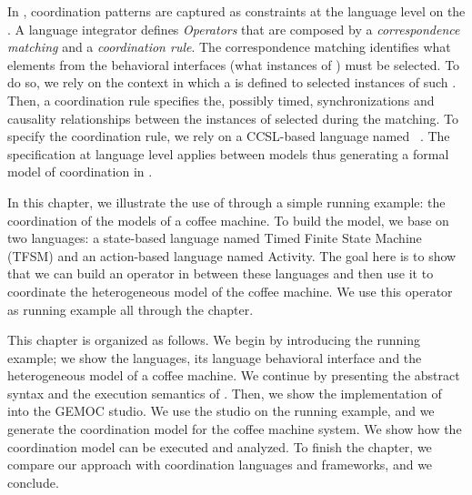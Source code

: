 In \bcool, coordination patterns are captured as constraints at the language level on the \dse. A language integrator defines \emph{Operators} that are composed by a \emph{correspondence matching} and a \emph{coordination rule}. The correspondence matching identifies what elements from the behavioral interfaces (\ie what instances of \dse) must be selected. To do so, we rely on the context in which a \dse is defined to selected instances of such \dse. Then, a coordination rule specifies the, possibly timed, synchronizations and causality relationships between the instances of \dse selected during the matching. To specify the coordination rule, we rely on a CCSL-based language named \moccml~\cite{moccmlbib}. The specification at language level applies between models thus generating a formal model of coordination in \ccsl.

	



In this chapter, we illustrate the use of \bcool through a simple running example: the coordination of the models of a coffee machine. To build the model, we base on two languages: a state-based language named Timed Finite State Machine (TFSM) and an action-based language named Activity. The goal here is to show that we can build an operator in \bcool between these languages and then use it to coordinate the heterogeneous model of the coffee machine. We use this operator as running example all through the chapter. 
	
This chapter is organized as follows. We begin by introducing the running example; we show the languages, its language behavioral interface and the heterogeneous model of a coffee machine. We continue by presenting the abstract syntax and the execution semantics of \bcool. Then, we show the implementation of \bcool into the GEMOC studio. We use the studio on the running example, and we generate the coordination model for the coffee machine system. We show how the coordination model can be executed and analyzed. To finish the chapter, we compare our approach with coordination languages and frameworks, and we conclude.

